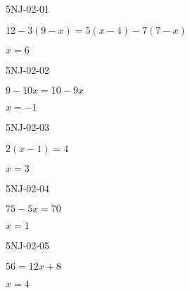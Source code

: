 

\begin{defproblem}{5NJ-02-01}%
\begin{onlyproblem}%
$12-3(9-x)=5(x-4)-7(7-x)$

\end{onlyproblem}%
\begin{onlysolution}%
$x=6$

\end{onlysolution}%
\end{defproblem}





\begin{defproblem}{5NJ-02-02}%
\begin{onlyproblem}%
$9-10 x=10-9 x$

\end{onlyproblem}%
\begin{onlysolution}%
$x=-1$

\end{onlysolution}%
\end{defproblem}





\begin{defproblem}{5NJ-02-03}%
\begin{onlyproblem}%
$2(x-1)=4$

\end{onlyproblem}%
\begin{onlysolution}%
$x=3$

\end{onlysolution}%
\end{defproblem}





\begin{defproblem}{5NJ-02-04}%
\begin{onlyproblem}%
$75-5 x=70$

\end{onlyproblem}%
\begin{onlysolution}%
$x=1$

\end{onlysolution}%
\end{defproblem}


\begin{defproblem}{5NJ-02-05}%
\begin{onlyproblem}%
$56=12 x+8$

\end{onlyproblem}%
\begin{onlysolution}%
$x=4$

\end{onlysolution}%
\end{defproblem}




